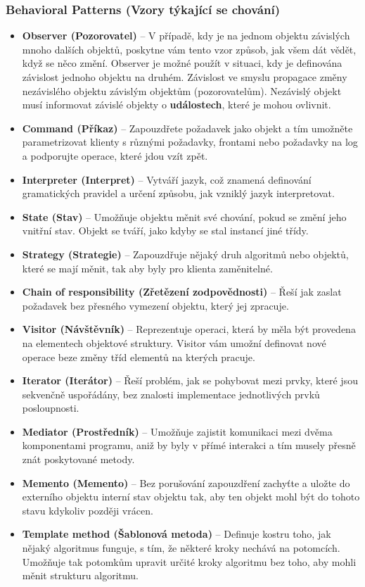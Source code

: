 \subsubsection{Behavioral Patterns (Vzory týkající se chování)}
\begin{itemize}
	\item \textbf{Observer (Pozorovatel)} -- V případě, kdy je na jednom objektu závislých mnoho dalších objektů, poskytne vám tento vzor způsob, jak všem dát vědět, když se něco změní. Observer je možné použít v situaci, kdy je definována závislost jednoho objektu na druhém. Závislost ve smyslu propagace změny nezávislého objektu závislým objektům (pozorovatelům). Nezávislý objekt musí informovat závislé objekty o \textbf{událostech}, které je mohou ovlivnit.
	\item \textbf{Command (Příkaz)} -- Zapouzdřete požadavek jako objekt a tím umožněte parametrizovat klienty s různými požadavky, frontami nebo požadavky na log a podporujte operace, které jdou vzít zpět.
	\item \textbf{Interpreter (Interpret)} -- Vytváří jazyk, což znamená definování gramatických pravidel a určení způsobu, jak vzniklý jazyk interpretovat.
	\item \textbf{State (Stav)} -- Umožňuje objektu měnit své chování, pokud se změní jeho vnitřní stav. Objekt se tváří, jako kdyby se stal instancí jiné třídy.
	\item \textbf{Strategy (Strategie)} -- Zapouzdřuje nějaký druh algoritmů nebo objektů, které se mají měnit, tak aby byly pro klienta zaměnitelné.
	\item \textbf{Chain of responsibility (Zřetězení zodpovědnosti)} -- Řeší jak zaslat požadavek bez přesného vymezení objektu, který jej zpracuje.
	\item \textbf{Visitor (Návštěvník)} -- Reprezentuje operaci, která by měla být provedena na elementech objektové struktury. Visitor vám umožní definovat nové operace beze změny tříd elementů na kterých pracuje.
	\item \textbf{Iterator (Iterátor)} -- Řeší problém, jak se pohybovat mezi prvky, které jsou sekvenčně uspořádány, bez znalosti implementace jednotlivých prvků posloupnosti.
	\item \textbf{Mediator (Prostředník)} -- Umožňuje zajistit komunikaci mezi dvěma komponentami programu, aniž by byly v přímé interakci a tím musely přesně znát poskytované metody.
	\item \textbf{Memento (Memento)} -- Bez porušování zapouzdření zachyťte a uložte do externího objektu interní stav objektu tak, aby ten objekt mohl být do tohoto stavu kdykoliv později vrácen.
	\item \textbf{Template method (Šablonová metoda)} -- Definuje kostru toho, jak nějaký algoritmus funguje, s tím, že některé kroky nechává na potomcích. Umožňuje tak potomkům upravit určité kroky algoritmu bez toho, aby mohli měnit strukturu algoritmu.
\end{itemize}
